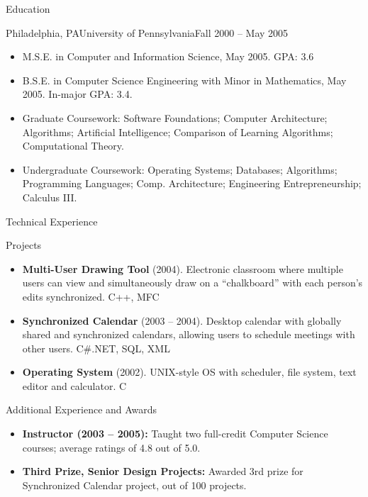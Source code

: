 \documentclass[]{cv}
\begin{document}
	\begin{cvsection}{Education}
		\begin{cvsubsection}{Philadelphia, PA}{University of Pennsylvania}{Fall 2000 -- May 2005}
			\begin{itemize}
				\item M.S.E. in Computer and Information Science, May 2005. GPA: 3.6
				\item B.S.E. in Computer Science Engineering with Minor in Mathematics, May 2005.  In-major GPA: 3.4.
				\item Graduate Coursework: Software Foundations; Computer Architecture; Algorithms; Artificial Intelligence; Comparison of Learning Algorithms; Computational Theory.
				\item Undergraduate Coursework: Operating Systems; Databases; Algorithms; Programming Languages; Comp. Architecture; Engineering Entrepreneurship; Calculus III.
			\end{itemize}
		\end{cvsubsection}
	\end{cvsection}
	
	\begin{cvsection}{Technical Experience}
		\begin{cvsubsection}{Projects}{}{}
			\begin{itemize}
				\item \textbf{Multi-User Drawing Tool} (2004). Electronic classroom where multiple users can view and simultaneously draw on a “chalkboard” with each person’s edits synchronized.  C++, MFC
				\item \textbf{Synchronized Calendar} (2003 – 2004). Desktop calendar with globally shared and synchronized calendars, allowing users to schedule meetings with other users.  C\#.NET, SQL, XML
				\item \textbf{Operating System} (2002).  UNIX-style OS with scheduler, file system, text editor and calculator. C
			\end{itemize}
		\end{cvsubsection}
	\end{cvsection}
	
	\begin{cvsection}{Additional Experience and Awards}
		\begin{cvsubsection}{}{}{}	
			\begin{itemize}
				\item \textbf{Instructor (2003 – 2005):} Taught two full-credit Computer Science courses; average ratings of 4.8 out of 5.0.
				\item \textbf{Third Prize, Senior Design Projects:} Awarded 3rd prize for Synchronized Calendar project, out of 100 projects.
			\end{itemize}
		\end{cvsubsection}
	\end{cvsection}
	
\end{document}
